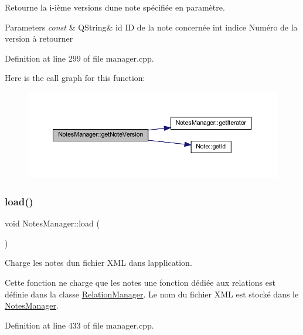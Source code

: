 Retourne la i-\/ième versions d\textquotesingle{}une note spécifiée en paramètre. 


\begin{DoxyParams}{Parameters}
{\em const} & Q\+String\& id ID de la note concernée int indice Numéro de la version à retourner \\
\hline
\end{DoxyParams}


Definition at line 299 of file manager.\+cpp.

Here is the call graph for this function\+:\nopagebreak
\begin{figure}[H]
\begin{center}
\leavevmode
\includegraphics[width=350pt]{class_notes_manager_a0461145357fe17bf07c3b09c665b95db_cgraph}
\end{center}
\end{figure}
\mbox{\label{class_notes_manager_ad4fb2de50633dd25b71024343341cd64}} 
\subsubsection{\texorpdfstring{load()}{load()}}
{\footnotesize\ttfamily void Notes\+Manager\+::load (\begin{DoxyParamCaption}{ }\end{DoxyParamCaption})}



Charge les notes d\textquotesingle{}un fichier X\+ML dans l\textquotesingle{}application. 

Cette fonction ne charge que les notes une fonction dédiée aux relations est définie dans la classe \hyperlink{class_relation_manager}{Relation\+Manager}. Le nom du fichier X\+ML est stocké dans le \hyperlink{class_notes_manager}{Notes\+Manager}. 

Definition at line 433 of file manager.\+cpp.

